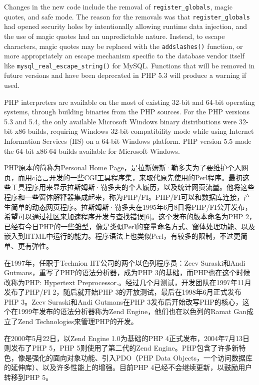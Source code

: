 Changes in the new code include the removal of \texttt{register\_globals}, magic quotes, and safe mode. The reason for the removals was that \texttt{register\_globals} had opened security holes by intentionally allowing runtime data injection, and the use of magic quotes had an unpredictable nature. Instead, to escape characters, magic quotes may be replaced with the \texttt{addslashes()} function, or more appropriately an escape mechanism specific to the database vendor itself like \texttt{mysql\_real\_escape\_string()} for MySQL. Functions that will be removed in future versions and have been deprecated in PHP 5.3 will produce a warning if used.

PHP interpreters are available on the most of existing 32-bit and 64-bit operating systems, through building binaries from the PHP sources. For the PHP versions 5.3 and 5.4, the only available Microsoft Windows binary distributions were 32-bit x86 builds, requiring Windows 32-bit compatibility mode while using Internet Information Services (IIS) on a 64-bit Windows platform. PHP version 5.5 made the 64-bit x86-64 builds available for Microsoft Windows.

PHP原本的简称为Personal Home Page，是拉斯姆斯·勒多夫为了要维护个人网页，而用c语言开发的一些CGI工具程序集，来取代原先使用的Perl程序。最初这些工具程序用来显示拉斯姆斯·勒多夫的个人履历，以及统计网页流量。他将这些程序和一些窗体解释器集成起来，称为PHP/FI。PHP/FI可以和数据库连接，产生简单的动态网页程序。拉斯姆斯·勒多夫在1995年6月8日将PHP/FI公开发布，希望可以通过社区来加速程序开发与查找错误[6]。这个发布的版本命名为PHP 2，已经有今日PHP的一些雏型，像是类似Perl的变量命名方式、窗体处理功能、以及嵌入到HTML中运行的能力。程序语法上也类似Perl，有较多的限制，不过更简单、更有弹性。

在1997年，任职于Technion IIT公司的两个以色列程序员：Zeev Suraski和Andi Gutmans，重写了PHP的语法分析器，成为PHP 3的基础，而PHP也在这个时候改称为PHP: Hypertext Preprocessor.。经过几个月测试，开发团队在1997年11月发布了PHP/FI 2，随后就开始PHP 3的开放测试，最后在1998年6月正式发布PHP 3。Zeev Suraski和Andi Gutmans在PHP 3发布后开始改写PHP的核心，这个在1999年发布的语法分析器称为Zend Engine，他们也在以色列的Ramat Gan成立了Zend Technologies来管理PHP的开发。

在2000年5月22日，以Zend Engine 1.0为基础的PHP 4正式发布，2004年7月13日则发布了PHP 5，PHP 5则使用了第二代的Zend Engine。PHP包含了许多新特色，像是强化的面向对象功能、引入PDO（PHP Data Objects，一个访问数据库的延伸库）、以及许多性能上的增强。目前PHP 4已经不会继续更新，以鼓励用户转移到PHP 5。

